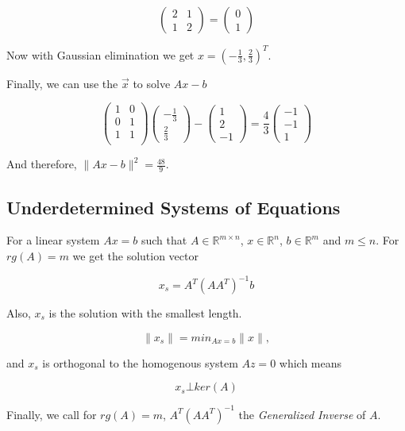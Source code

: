 \[
\begin{pmatrix}
2 & 1 \\
1 & 2
\end{pmatrix}
= 
\begin{pmatrix}
0 \\
1
\end{pmatrix}
\]

Now with Gaussian elimination we get \(x = (-\frac{1}{3}, \frac{2}{3})^T\). 
\vspace{\baselineskip}

Finally, we can use the \(\vec{x}\) to solve \(Ax - b\)

\[
\begin{pmatrix}
	1 & 0 \\
	0 & 1 \\
	1 & 1 \\
\end{pmatrix}
\begin{pmatrix}
	-\frac{1}{3} \\
	\frac{2}{3}
\end{pmatrix}
-
\begin{pmatrix}
	1 \\
	2 \\
	-1
\end{pmatrix}
=
\frac{4}{3}
\begin{pmatrix}
-1 \\
-1 \\
1
\end{pmatrix}
\]

And therefore, \(\|Ax - b\|^2 = \frac{48}{9}\).

\subsection{Underdetermined Systems of Equations}

For a linear system \(Ax = b\) such that \(A \in \mathbb{R}^{m \times n}\), \(x\in \mathbb{R}^n\), 
\(b \in \mathbb{R}^m\) and \(m \le n\). For \(rg(A) = m\) we get the solution vector

\[
x_s = A^T {(A A^T)}^{-1} b
\]

Also, \(x_s\) is the solution with the smallest length. 

\[
\|x_s\| = min_{Ax = b} \|x\|,
\] 

and \(x_s\) is orthogonal to the homogenous system \(Az = 0\) which means

\[
x_s \bot ker(A)
\]

Finally, we call for  \(rg(A) = m\), \(A^T {(A A^T)}^{-1}\) the \emph{Generalized Inverse} of \(A\).
\vspace{\baselineskip}

